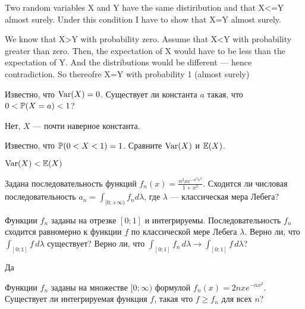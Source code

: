 \begin{problem}
Two random variables X and Y have the same distiribution and that X<=Y almost surely. 
Under this condition I have to show that X=Y almost surely. 
\end{problem} 
\begin{solution} 

We know that X>Y with probability zero. Assume that X<Y with probability greater than zero. Then, the expectation of X would have to be less than the expectation of Y. And the distributions would be different --- hence contradiction. So thereofre X=Y with probability 1 (almost surely) 
\end{solution}

\begin{problem}
Известно, что $\Var(X)=0$. Существует ли константа $a$ такая, что $0<\P(X=a)<1$?
\end{problem} 
\begin{solution} 
Нет, $X$ --- почти наверное константа.
\end{solution}

\begin{problem}
Известно, что $\P(0<X<1)=1$. Сравните $\Var(X)$ и $\E(X)$.
\end{problem} 
\begin{solution} 
$\Var(X)<\E(X)$
\end{solution}

\begin{problem}
Задана последовательность функций $f_n(x)=\frac{n^2 x e^{-n^2 x^2}}{1+x^2}$. Сходится ли числовая последовательность $a_n=\int_{[0;+\infty)}f_n d\lambda$, где $\lambda$ --- классическая мера Лебега?
\end{problem} 
\begin{solution} 

\end{solution}

\begin{problem}
Функции $f_n$ заданы на отрезке $[0;1]$ и интегрируемы. Последовательность $f_n$ сходится равномерно к функции $f$ по классической мере Лебега $\lambda$. Верно ли, что $\int_{[0;1]} f\,d\lambda$ существует? Верно ли, что $\int_{[0;1]} f_n\,d\lambda\to \int_{[0;1]} f\,d\lambda$?
\end{problem} 
\begin{solution} 
Да
\end{solution}

\begin{problem}
Функции $f_n$ заданы на множестве $[0;\infty)$ формулой $f_n(x)=2nxe^{-nx^2}$. Существует ли  интегрируемая функция $f$, такая что $f\geq f_n$ для всех $n$?
\end{problem} 
\begin{solution} 
\end{solution}


